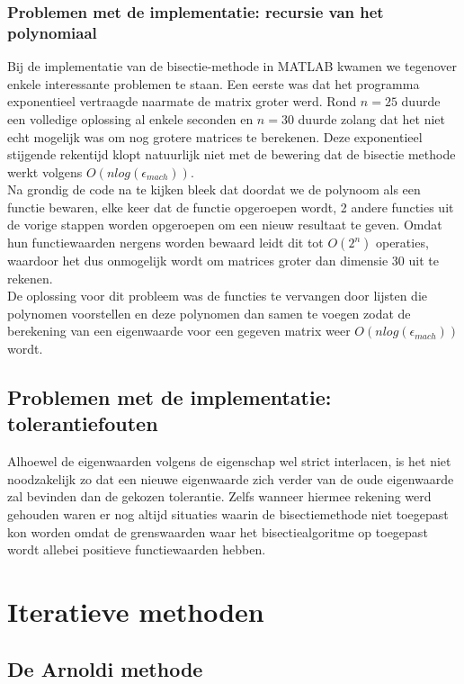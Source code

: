 \documentclass[a4paper]{article}
\begin{document}
\subsubsection{Problemen met de implementatie: recursie van het polynomiaal}
Bij de implementatie van de bisectie-methode in MATLAB kwamen we tegenover enkele interessante problemen te staan. Een eerste was dat het programma exponentieel vertraagde naarmate de matrix groter werd. Rond $n=25$ duurde een volledige oplossing al enkele seconden en $n=30$ duurde zolang dat het niet echt mogelijk was om nog grotere matrices te berekenen. Deze exponentieel stijgende rekentijd klopt natuurlijk niet met de bewering dat de bisectie methode werkt volgens $O(nlog(\epsilon_{mach}))$. \\
Na grondig de code na te kijken bleek dat doordat we de polynoom als een functie bewaren, elke keer dat de functie opgeroepen wordt, 2 andere functies uit de vorige stappen worden opgeroepen om een nieuw resultaat te geven. Omdat hun functiewaarden nergens worden bewaard leidt dit tot $O(2^{n})$ operaties, waardoor het dus onmogelijk wordt om matrices groter dan dimensie 30 uit te rekenen. \\
De oplossing voor dit probleem was de functies te vervangen door lijsten die polynomen voorstellen en deze polynomen dan samen te voegen zodat de berekening van een eigenwaarde voor een gegeven matrix weer $O(nlog(\epsilon_{mach}))$ wordt.
\subsection{Problemen met de implementatie: tolerantiefouten}
Alhoewel de eigenwaarden volgens de eigenschap wel strict interlacen, is het niet noodzakelijk zo dat een nieuwe eigenwaarde zich verder van de oude eigenwaarde zal bevinden dan de gekozen tolerantie. Zelfs wanneer hiermee rekening werd gehouden waren er nog altijd situaties waarin de bisectiemethode niet toegepast kon worden omdat de grenswaarden waar het bisectiealgoritme op toegepast wordt allebei positieve functiewaarden hebben.
\section{Iteratieve methoden}
\subsection{De Arnoldi methode}
\end{document}
